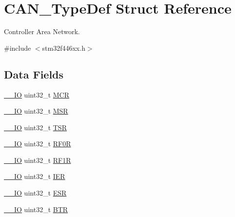 \hypertarget{struct_c_a_n___type_def}{}\section{C\+A\+N\+\_\+\+Type\+Def Struct Reference}
\label{struct_c_a_n___type_def}


Controller Area Network.  




{\ttfamily \#include $<$stm32f446xx.\+h$>$}

\subsection*{Data Fields}
\begin{DoxyCompactItemize}
\item 
\mbox{\hyperlink{core__sc300_8h_aec43007d9998a0a0e01faede4133d6be}{\+\_\+\+\_\+\+IO}} uint32\+\_\+t \mbox{\hyperlink{struct_c_a_n___type_def_a27af4e9f888f0b7b1e8da7e002d98798}{M\+CR}}
\item 
\mbox{\hyperlink{core__sc300_8h_aec43007d9998a0a0e01faede4133d6be}{\+\_\+\+\_\+\+IO}} uint32\+\_\+t \mbox{\hyperlink{struct_c_a_n___type_def_acdd4c1b5466be103fb2bb2a225b1d3a9}{M\+SR}}
\item 
\mbox{\hyperlink{core__sc300_8h_aec43007d9998a0a0e01faede4133d6be}{\+\_\+\+\_\+\+IO}} uint32\+\_\+t \mbox{\hyperlink{struct_c_a_n___type_def_a87e3001757a0cd493785f1f3337dd0e8}{T\+SR}}
\item 
\mbox{\hyperlink{core__sc300_8h_aec43007d9998a0a0e01faede4133d6be}{\+\_\+\+\_\+\+IO}} uint32\+\_\+t \mbox{\hyperlink{struct_c_a_n___type_def_accf4141cee239380d0ad4634ee21dbf6}{R\+F0R}}
\item 
\mbox{\hyperlink{core__sc300_8h_aec43007d9998a0a0e01faede4133d6be}{\+\_\+\+\_\+\+IO}} uint32\+\_\+t \mbox{\hyperlink{struct_c_a_n___type_def_a02b589bb589df4f39e549dca4d5abb08}{R\+F1R}}
\item 
\mbox{\hyperlink{core__sc300_8h_aec43007d9998a0a0e01faede4133d6be}{\+\_\+\+\_\+\+IO}} uint32\+\_\+t \mbox{\hyperlink{struct_c_a_n___type_def_a6566f8cfbd1d8aa7e8db046aa35e77db}{I\+ER}}
\item 
\mbox{\hyperlink{core__sc300_8h_aec43007d9998a0a0e01faede4133d6be}{\+\_\+\+\_\+\+IO}} uint32\+\_\+t \mbox{\hyperlink{struct_c_a_n___type_def_a2b39f943954e0e7d177b511d9074a0b7}{E\+SR}}
\item 
\mbox{\hyperlink{core__sc300_8h_aec43007d9998a0a0e01faede4133d6be}{\+\_\+\+\_\+\+IO}} uint32\+\_\+t \mbox{\hyperlink{struct_c_a_n___type_def_a5c0fcd3e7b4c59ab1dd68f6bd8f74e07}{B\+TR}}

\end{DoxyCompactItemize}
